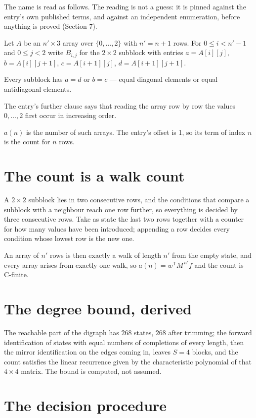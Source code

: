 \documentclass[11pt]{article}
\theoremstyle{definition}
\begin{document}
The name is read as follows. The reading is not a guess: it is pinned against the entry's own published terms, and against an independent enumeration, before anything is proved (Section 7).

Let $A$ be an $n' \times 3$ array over $\{0,\dots,2\}$ with $n' = n + 1$ rows. For $0 \le i < n'-1$ and $0 \le j < 2$ write $B_{i,j}$ for the $2\times2$ subblock with entries $a = A[i][j]$, $b = A[i][j{+}1]$, $c = A[i{+}1][j]$, $d = A[i{+}1][j{+}1]$.

Every subblock has $a = d$ or $b = c$ --- equal diagonal elements or equal antidiagonal elements.

The entry's further clause says that reading the array row by row the values $0,\dots,2$ first occur in increasing order.

$a(n)$ is the number of such arrays. The entry's offset is 1, so its term of index $n$ is the count for $n$ rows.

\section{The count is a walk count}

A $2\times2$ subblock lies in two consecutive rows, and the conditions that compare a subblock with a neighbour reach one row further, so everything is decided by three consecutive rows. Take as state the last two rows together with a counter for how many values have been introduced; appending a row decides every condition whose lowest row is the new one.

An array of $n'$ rows is then exactly a walk of length $n'$ from the empty state, and every array arises from exactly one walk, so $a(n) = w^{\mathsf T}M^{\,n'}f$ and the count is C-finite.

\section{The degree bound, derived}

The reachable part of the digraph has $268$ states, $268$ after trimming; the forward identification of states with equal numbers of completions of every length, then the mirror identification on the edges coming in, leaves $S = 4$ blocks, and the count satisfies the linear recurrence given by the characteristic polynomial of that $4\times4$ matrix. The bound is computed, not assumed.

\section{The decision procedure}
\end{document}
